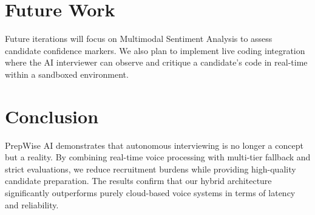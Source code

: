 \documentclass[conference]{IEEEtran}
\begin{document}
\section{Future Work}
Future iterations will focus on Multimodal Sentiment Analysis to assess candidate confidence markers. We also plan to implement live coding integration where the AI interviewer can observe and critique a candidate's code in real-time within a sandboxed environment.

\section{Conclusion}
PrepWise AI demonstrates that autonomous interviewing is no longer a concept but a reality. By combining real-time voice processing with multi-tier fallback and strict evaluations, we reduce recruitment burdens while providing high-quality candidate preparation. The results confirm that our hybrid architecture significantly outperforms purely cloud-based voice systems in terms of latency and reliability.
\end{document}
